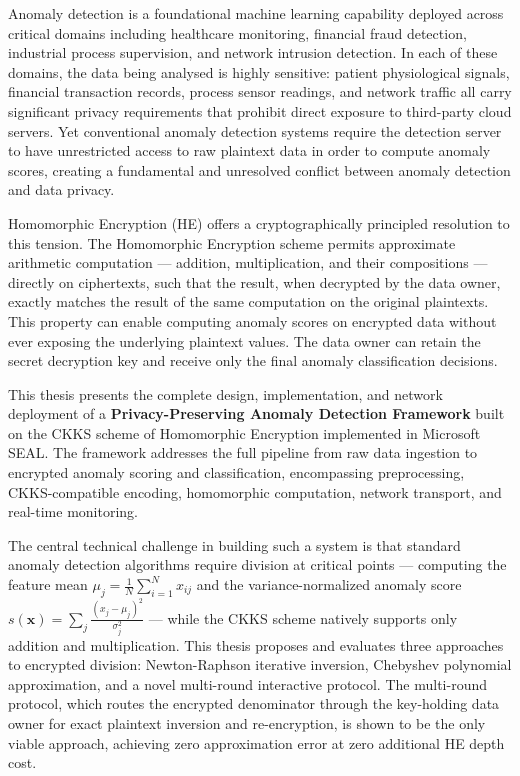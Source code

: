 \begingroup\setcounter{secnumdepth}{2}

Anomaly detection is a foundational machine learning capability deployed
across critical domains including healthcare monitoring, financial fraud
detection, industrial process supervision, and network intrusion detection.
In each of these domains, the data being analysed is highly sensitive:
patient physiological signals, financial transaction records, process sensor
readings, and network traffic all carry significant privacy requirements that
prohibit direct exposure to third-party cloud servers. Yet conventional anomaly
detection systems require the detection server to have unrestricted access to
raw plaintext data in order to compute anomaly scores, creating a fundamental
and unresolved conflict between anomaly detection and data privacy.

Homomorphic Encryption (HE) offers a cryptographically principled resolution
to this tension. The Homomorphic Encryption scheme permits approximate
arithmetic computation --- addition, multiplication, and their compositions ---
directly on ciphertexts, such that the result, when decrypted by the data
owner, exactly matches the result of the same computation on the original
plaintexts. This property can enable computing anomaly scores on
encrypted data without ever exposing the underlying plaintext values. The
data owner can retain the secret decryption key and receive only the final
anomaly classification decisions.

This thesis presents the complete design, implementation, and network
deployment of a \textbf{Privacy-Preserving Anomaly Detection Framework} built
on the CKKS scheme of Homomorphic Encryption implemented in Microsoft SEAL. The framework addresses the
full pipeline from raw data ingestion to encrypted anomaly scoring and
classification, encompassing preprocessing, CKKS-compatible encoding,
homomorphic computation, network transport, and real-time monitoring.

The central technical challenge in building such a system is that standard
anomaly detection algorithms require division at critical points --- computing
the feature mean $\mu_j = \frac{1}{N}\sum_{i=1}^N x_{ij}$ and the
variance-normalized anomaly score $s(\mathbf{x}) = \sum_j
\frac{(x_j-\mu_j)^2}{\sigma_j^2}$ --- while the CKKS scheme natively supports
only addition and multiplication. This thesis proposes and evaluates three
approaches to encrypted division: Newton-Raphson iterative inversion, Chebyshev
polynomial approximation, and a novel multi-round interactive protocol. The
multi-round protocol, which routes the encrypted denominator through the
key-holding data owner for exact plaintext inversion and re-encryption, is
shown to be the only viable approach, achieving zero approximation error at
zero additional HE depth cost.

